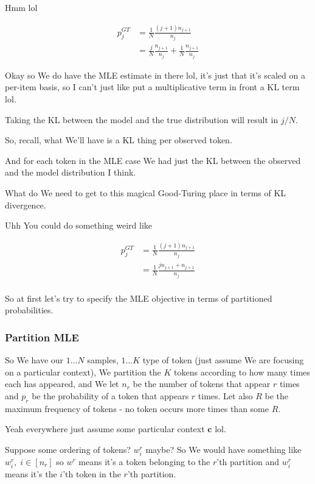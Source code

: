 \documentclass{article}
\newcommand{\context}{\boldsymbol{c}}
\begin{document}
		Hmm lol
		
		\begin{align}
			p_j^{GT}  &= \frac{1}{N}\frac{(j+1)n_{j+1}}{n_j}\\
			&= \frac{j}{N}\frac{ n_{j+1}}{n_j}+\frac{1}{N}\frac{n_{j+1}}{n_j}
		\end{align}
		
		Okay so We do have the MLE estimate in there lol, it's just that it's scaled on a per-item basis, so I can't just like put a multiplicative term in front a KL term lol.
		
		Taking the KL between the model and the true distribution will result in $j/N$.
		
		So, recall, what We'll have is a KL thing per observed token.
		
		And for each token in the MLE case We had just the KL between the observed and the model distribution I think.
		
		What do We need to get to this magical Good-Turing place in terms of KL divergence.
		
		Uhh You could do something weird like 
		
		\begin{align}
			p_j^{GT}  &= \frac{1}{N}\frac{(j+1)n_{j+1}}{n_j}\\
			&= \frac{1}{N}\frac{jn_{j+1} + n_{j+1}}{n_j}\\
		\end{align}
		
		So at first let's try to specify the MLE objective in terms of partitioned probabilities.
		
		\subsubsection{Partition MLE}
		
			So We have our $1\ldots N$ samples, $1\ldots K$ type of token (just assume We are focusing on a particular context), We partition the $K$ tokens according to how many times each has appeared, and We let $n_r$ be the number of tokens that appear $r$ times and $p_r$ be the probability of a token that appears $r$ times. Let also $R$ be the maximum frequency of tokens - no token occurs more times than some $R$.
			
			Yeah everywhere just assume some particular context $\context$ lol.
			
			Suppose some ordering of tokens? $w^r_i$ maybe? So We would have something like $w^r_i,\;i\in[n_r]$ so $w^r$ means it's a token belonging to the $r$'th partition and $w^r_i$ means it's the $i$'th token in the $r$'th partition.
			
\end{document}
